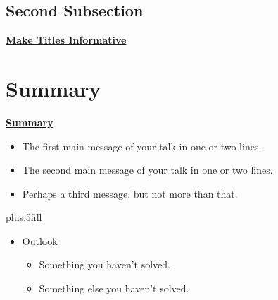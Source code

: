 \documentclass{beamer}
\begin{document}
\subsection{Second Subsection}

\begin{frame}{\underline{\textbf{Make Titles Informative}}}
\end{frame}


\section{Summary}

\begin{frame}{\underline{\textbf{Summary}}}
  \begin{itemize}
  \item
    The \alert{first main message} of your talk in one or two lines.
  \item
    The \alert{second main message} of your talk in one or two lines.
  \item
    Perhaps a \alert{third message}, but not more than that.
  \end{itemize}
  \vskip0pt plus.5fill
  \begin{itemize}
  \item
    Outlook
    \begin{itemize}
    \item
      Something you haven't solved.
    \item
      Something else you haven't solved.
    \end{itemize}
  \end{itemize}
\end{frame}
\end{document}
